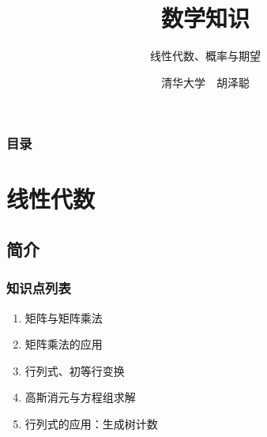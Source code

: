 \documentclass[9pt,dvipsnames]{beamer}
\title{数学知识}
\subtitle{线性代数、概率与期望}
\author{清华大学~~胡泽聪}
\date{}
\begin{document}
\maketitle

\begin{frame}
	\frametitle{目录}
	\tableofcontents[hideallsubsections]
\end{frame}

\section{线性代数}
\subsection{简介}
\begin{frame}
	\frametitle{知识点列表}
	\begin{enumerate}
		\item 矩阵与矩阵乘法
		\item 矩阵乘法的应用
		\item 行列式、初等行变换
		\item 高斯消元与方程组求解
		\item 行列式的应用：生成树计数
	\end{enumerate}
\end{frame}
\end{document}
